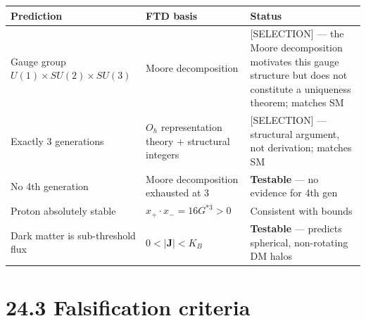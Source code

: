 \documentclass[
  11pt,
  letterpaper,
  twoside,
  openright]{book}
\begin{document}
\begin{longtable}[]{@{}
  >{\raggedright\arraybackslash}p{}
  >{\raggedright\arraybackslash}p{}
  >{\raggedright\arraybackslash}p{}@{}}
\toprule\noalign{}
\begin{minipage}[b]{\linewidth}\raggedright
Prediction
\end{minipage} & \begin{minipage}[b]{\linewidth}\raggedright
FTD basis
\end{minipage} & \begin{minipage}[b]{\linewidth}\raggedright
Status
\end{minipage} \\
\midrule\noalign{}
\endhead
\bottomrule\noalign{}
\endlastfoot
Gauge group \(U(1) \times SU(2) \times SU(3)\) & Moore decomposition &
{[}SELECTION{]} --- the Moore decomposition motivates this gauge
structure but does not constitute a uniqueness theorem; matches SM \\
Exactly 3 generations & \(O_h\) representation theory + structural
integers & {[}SELECTION{]} --- structural argument, not derivation;
matches SM \\
No 4th generation & Moore decomposition exhausted at 3 &
\textbf{Testable} --- no evidence for 4th gen \\
Proton absolutely stable & \(x_+ \cdot x_- = 16G^{*3} > 0\) & Consistent
with bounds \\
Dark matter is sub-threshold flux & \(0 < |\mathbf{J}| < K_B\) &
\textbf{Testable} --- predicts spherical, non-rotating DM halos \\
\end{longtable}

\section{24.3 Falsification criteria}\label{falsification-criteria}
\end{document}
